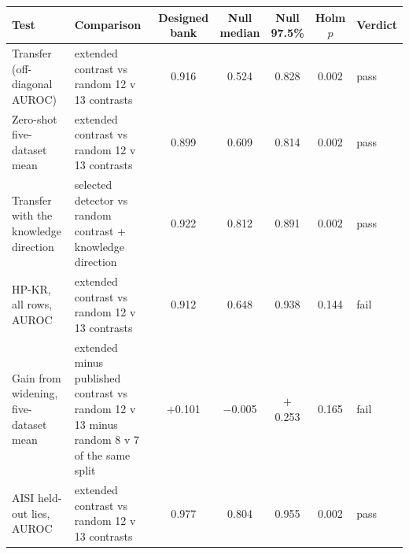 \begin{tabular}{@{}l l c c c c l@{}}
\toprule
Test & Comparison & Designed bank & \shortstack{Null\\median} & \shortstack{Null\\97.5\%} & \shortstack{Holm\\$p$} & Verdict \\
\midrule
Transfer (off-diagonal AUROC) & extended contrast vs random 12 v 13 contrasts & 0.916 & 0.524 & 0.828 & 0.002 & pass \\
Zero-shot five-dataset mean & extended contrast vs random 12 v 13 contrasts & 0.899 & 0.609 & 0.814 & 0.002 & pass \\
Transfer with the knowledge direction & selected detector vs random contrast + knowledge direction & 0.922 & 0.812 & 0.891 & 0.002 & pass \\
HP-KR, all rows, AUROC & extended contrast vs random 12 v 13 contrasts & 0.912 & 0.648 & 0.938 & 0.144 & fail \\
Gain from widening, five-dataset mean & extended minus published contrast vs random 12 v 13 minus random 8 v 7 of the same split & $+$0.101 & $-$0.005 & $+$0.253 & 0.165 & fail \\
AISI held-out lies, AUROC & extended contrast vs random 12 v 13 contrasts & 0.977 & 0.804 & 0.955 & 0.002 & pass \\
\bottomrule
\end{tabular}
